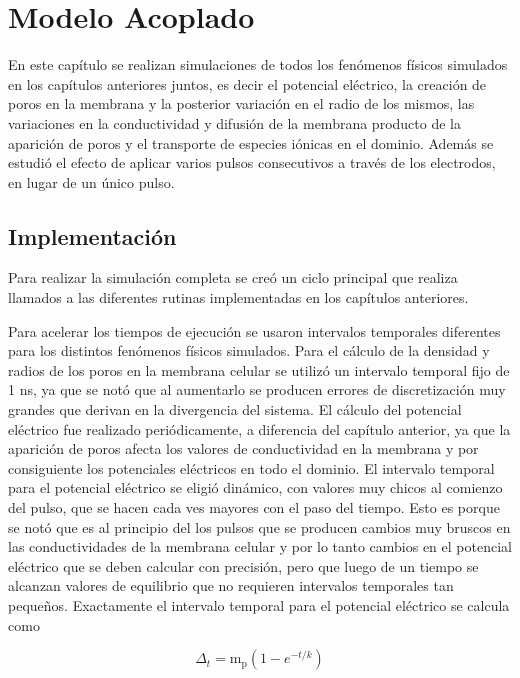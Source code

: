 \chapter{Modelo Acoplado} \label{chap:acoplado}

En este capítulo se realizan simulaciones de todos los fenómenos físicos simulados en los capítulos anteriores juntos, es decir el potencial eléctrico, la creación de poros en la membrana y la posterior variación en el radio de los mismos, las variaciones en la conductividad y difusión de la membrana producto de la aparición de poros y el transporte de especies iónicas en el dominio. Además se estudió el efecto de aplicar varios pulsos consecutivos a través de los electrodos, en lugar de un único pulso.

\section{Implementación}
Para realizar la simulación completa se creó un ciclo principal que realiza llamados a las diferentes rutinas implementadas en los capítulos anteriores.

Para acelerar los tiempos de ejecución se usaron intervalos temporales diferentes para los distintos fenómenos físicos simulados. Para el cálculo de la densidad y radios de los poros en la membrana celular se utilizó un intervalo temporal fijo de 1 \si{\nano\second}, ya que se notó que al aumentarlo se producen errores de discretización muy grandes que derivan en la divergencia del sistema. El cálculo del potencial eléctrico fue realizado periódicamente, a diferencia del capítulo anterior, ya que la aparición de poros afecta los valores de conductividad en la membrana y por consiguiente los potenciales eléctricos en todo el dominio. El intervalo temporal para el potencial eléctrico se eligió dinámico, con valores muy chicos al comienzo del pulso, que se hacen cada ves mayores con el paso del tiempo. Esto es porque se notó que es al principio del los pulsos que se producen cambios muy bruscos en las conductividades de la membrana celular y por lo tanto cambios en el potencial eléctrico que se deben calcular con precisión, pero que luego de un tiempo se alcanzan valores de equilibrio que no requieren intervalos temporales tan pequeños. Exactamente el intervalo temporal para el potencial eléctrico se calcula como

\begin{equation}
	\Delta_t = \mathrm{m_p} \left( 1 - e^{-t/k} \right)
\end{equation}

